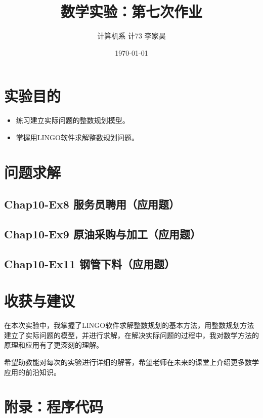 \documentclass[12pt,a4paper]{article}
\title{数学实验：第七次作业}
\author{计算机系 \quad 计73 \quad 2017011620 \quad 李家昊}
\date{\today}
\begin{document}
\maketitle

\section{实验目的}

\begin{itemize}
    \item 练习建立实际问题的整数规划模型。
    \item 掌握用LINGO软件求解整数规划问题。
\end{itemize}

\section{问题求解}

\subsection{Chap10-Ex8 服务员聘用（应用题）}



\subsection{Chap10-Ex9 原油采购与加工（应用题）}



\subsection{Chap10-Ex11 钢管下料（应用题）}



\section{收获与建议}

在本次实验中，我掌握了LINGO软件求解整数规划的基本方法，用整数规划方法建立了实际问题的模型，并进行求解，在解决实际问题的过程中，我对数学方法的原理和应用有了更深刻的理解。

希望助教能对每次的实验进行详细的解答，希望老师在未来的课堂上介绍更多数学应用的前沿知识。

\section{附录：程序代码}
\end{document}
